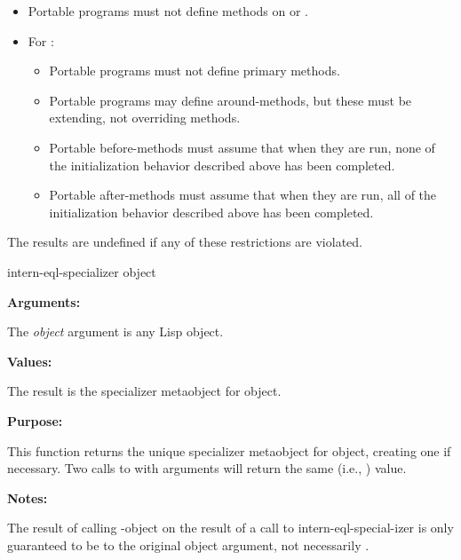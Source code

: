 \begin{itemize}
\item Portable programs must not define methods on  or
  .

\item For :

  \begin{itemize}
  \item Portable programs must not define primary methods.

  \item Portable programs may define around-methods, but these must be
    extending, not overriding methods.

  \item Portable before-methods must assume that when they are run, none of the
    initialization behavior described above has been completed.

  \item Portable after-methods must assume that when they are run, all of the
    initialization behavior described above has been completed.
  \end{itemize}
\end{itemize}

The results are undefined if any of these restrictions are violated.

\begin{defun}[Function]
intern-eql-specializer object

\textbf{Arguments:}

The \emph{object} argument is any Lisp object.

\textbf{Values:}

The result is the  specializer metaobject for object.

\textbf{Purpose:}

This function returns the unique  specializer metaobject for object, creating
one if necessary. Two calls to  with  arguments will
return the same (i.e., ) value. 

\textbf{Notes:}

The result of calling -object on the result of a call to
intern-eql-special-izer is only guaranteed to be  to the original object
argument, not necessarily .
\end{defun}

